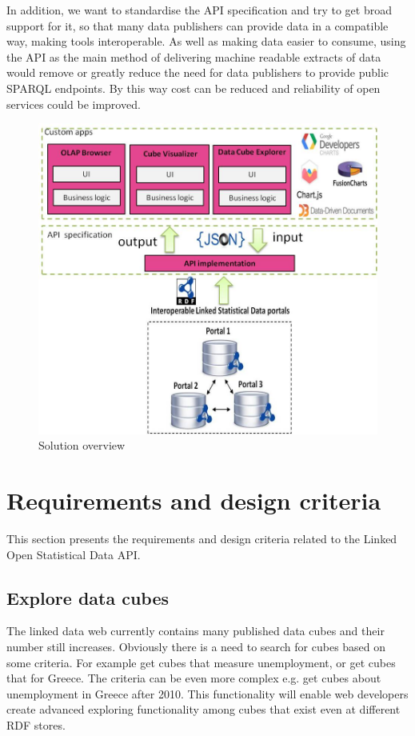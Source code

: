 \documentclass{llncs}
\begin{document}
In addition, we want to standardise the API specification and try to get broad support for it, so that many data publishers can provide data in a compatible way, making tools interoperable. As well as making data easier to consume, using the API as the main method of delivering machine readable extracts of data would remove or greatly reduce the need for data publishers to provide public SPARQL endpoints. By this way cost can be reduced and reliability of open services could be improved.

\begin{figure}
  \includegraphics{images/overview.jpg}
\caption{Solution overview}
\label{fig:overview}
\end{figure}


\section{Requirements and design criteria}\label{sec:reqs}

This section presents the requirements and design criteria related to the Linked Open Statistical Data API.

\subsection{Explore data cubes}

The linked data web currently contains many published data cubes and their number still increases. Obviously there is a need to search for cubes based on some criteria. For example get cubes that measure unemployment, or get cubes that for Greece. The criteria can be even more complex e.g. get cubes about unemployment in Greece after 2010. This functionality will enable web developers create advanced exploring functionality among cubes that exist even at different RDF stores.
\end{document}

